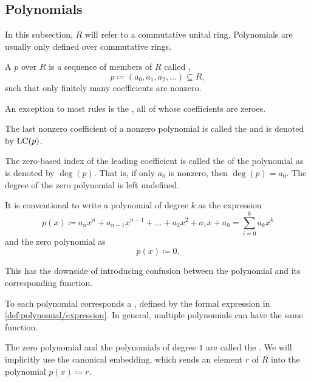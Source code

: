 \subsection{Polynomials}\label{subsec:polynomials}

\begin{remark}\label{remark:polynomial_commutative_ring}
  In this subsection, \( R \) will refer to a commutative unital ring. Polynomials are usually only defined over commutative rings.
\end{remark}

\begin{definition}\label{def:polynomial}\cite[149]{Knapp2016BAlg}
  A  \( p \) over \( R \) is a sequence of members of \( R \) called ,
  \begin{equation*}
    p \coloneqq ( a_0, a_1, a_2, \ldots ) \subseteq R,
  \end{equation*}
  such that only finitely many coefficients are nonzero.

  \begin{defenum}
     An exception to most rules is the , all of whose coefficients are zeroes.

     The last nonzero coefficient of a nonzero polynomial is called the  and is denoted by \( \operatorname{LC}(p) \).

     The zero-based index of the leading coefficient is called the  of the polynomial as is denoted by \( \deg(p) \). That is, if only \( a_0 \) is nonzero, then \( \deg(p) = a_0 \). The degree of the zero polynomial is left undefined.

     It is conventional to write a polynomial of degree \( k \) as the expression
    \begin{equation*}
      p(x) \coloneqq a_n x^n + a_{n-1} x^{n-1} + \ldots + a_2 x^2 + a_1 x + a_0 = \sum_{i=0}^k a_k x^k
    \end{equation*}
    and the zero polynomial as
    \begin{equation*}
      p(x) \coloneqq 0.
    \end{equation*}

    This has the downside of introducing confusion between the polynomial and its corresponding function.

     To each polynomial corresponds a , defined by the formal expression in \cref{def:polynomial/expression}. In general, multiple polynomials can have the same function.

     The zero polynomial and the polynomials of degree \( 1 \) are called the . We will implicitly use the canonical embedding, which sends an element \( r \) of \( R \) into the polynomial \( p(x) \coloneqq r \).
  \end{defenum}
\end{definition}

